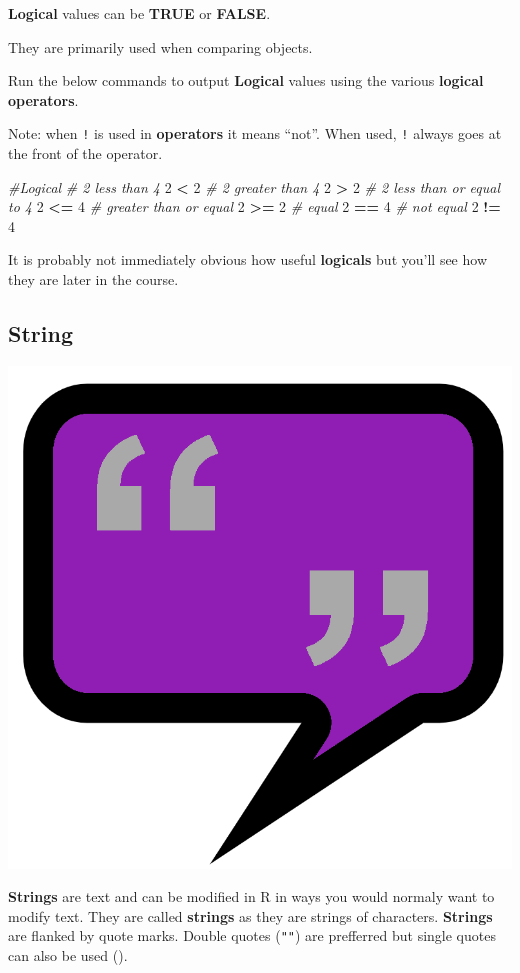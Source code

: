 \documentclass[]{book}
\newenvironment{Shaded}{\begin{snugshade}}{\end{snugshade}}
\newcommand{\DecValTok}[1]{\textcolor[rgb]{0.00,0.00,0.81}{#1}}
\newcommand{\StringTok}[1]{\textcolor[rgb]{0.31,0.60,0.02}{#1}}
\newcommand{\CommentTok}[1]{\textcolor[rgb]{0.56,0.35,0.01}{\textit{#1}}}
\newcommand{\OperatorTok}[1]{\textcolor[rgb]{0.81,0.36,0.00}{\textbf{#1}}}
\begin{document}
\textbf{Logical} values can be \textbf{TRUE} or \textbf{FALSE}.

They are primarily used when comparing objects.

Run the below commands to output \textbf{Logical} values using the
various \textbf{logical operators}.

Note: when \texttt{!} is used in \textbf{operators} it means ``not''.
When used, \texttt{!} always goes at the front of the operator.

\begin{Shaded}
\begin{Highlighting}[]
\CommentTok{#Logical}
\CommentTok{# 2 less than 4 }
\DecValTok{2} \OperatorTok{<}\StringTok{ }\DecValTok{2}
\CommentTok{# 2 greater than 4}
\DecValTok{2} \OperatorTok{>}\StringTok{ }\DecValTok{2}
\CommentTok{# 2 less than or equal to 4}
\DecValTok{2} \OperatorTok{<=}\StringTok{ }\DecValTok{4}
\CommentTok{# greater than or equal}
\DecValTok{2} \OperatorTok{>=}\StringTok{ }\DecValTok{2}
\CommentTok{# equal}
\DecValTok{2} \OperatorTok{==}\StringTok{ }\DecValTok{4}
\CommentTok{# not equal}
\DecValTok{2} \OperatorTok{!=}\StringTok{ }\DecValTok{4}
\end{Highlighting}
\end{Shaded}

It is probably not immediately obvious how useful \textbf{logicals} but
you'll see how they are later in the course.

\subsection{String}\label{string}

\begin{center}\includegraphics[width=0.2\linewidth]{figures/string_bubble} \end{center}

\textbf{Strings} are text and can be modified in R in ways you would
normaly want to modify text. They are called \textbf{strings} as they
are strings of characters. \textbf{Strings} are flanked by quote marks.
Double quotes (\texttt{""}) are prefferred but single quotes can also be
used (\texttt{\textquotesingle{}\textquotesingle{}}).
\end{document}
